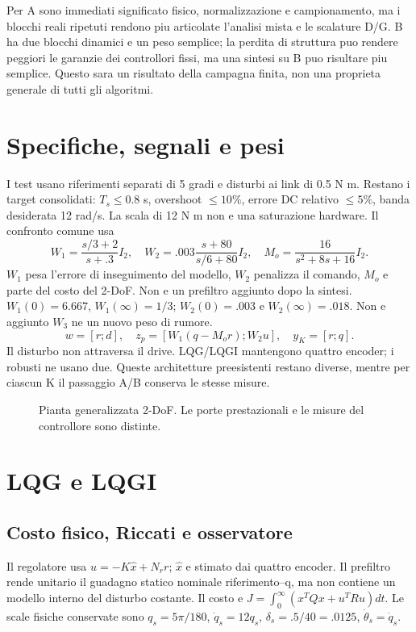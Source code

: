 \documentclass[11pt,a4paper,oneside]{report}
\newcommand{\schema}[2]{\begin{figure}[htbp]\centering\resizebox{.95\linewidth}{!}{}\caption{#2}\end{figure}}
\begin{document}
Per A sono immediati significato fisico, normalizzazione e campionamento,
ma i blocchi reali ripetuti rendono piu articolate l'analisi mista e le
scalature D/G. B ha due blocchi dinamici e un peso semplice; la perdita di
struttura puo rendere peggiori le garanzie dei controllori fissi, ma una
sintesi su B puo risultare piu semplice. Questo sara un risultato della
campagna finita, non una proprieta generale di tutti gli algoritmi.

\chapter{Specifiche, segnali e pesi}
I test usano riferimenti separati di 5 gradi e disturbi ai link di 0.5 N m.
Restano i target consolidati: $T_s\le0.8$ s, overshoot $\le10\%$,
errore DC relativo $\le5\%$, banda desiderata 12 rad/s.
La scala di 12 N m non e una saturazione hardware.
Il confronto comune usa
\[
W_1=\frac{s/3+2}{s+.3}I_2,\quad
W_2=.003\frac{s+80}{s/6+80}I_2,\quad
M_o=\frac{16}{s^2+8s+16}I_2.
\]
$W_1$ pesa l'errore di inseguimento del modello, $W_2$ penalizza il comando,
$M_o$ e parte del costo del 2-DoF. Non e un prefiltro aggiunto dopo la sintesi.
$W_1(0)=6.667$, $W_1(\infty)=1/3$; $W_2(0)=.003$ e
$W_2(\infty)=.018$. Non e aggiunto $W_3$ ne un nuovo peso di rumore.
\[
w=[r;d],\quad z_p=[W_1(q-M_or);W_2u],\quad y_K=[r;q].
\]
Il disturbo non attraversa il drive. LQG/LQGI mantengono quattro encoder;
i robusti ne usano due. Queste architetture preesistenti restano diverse,
mentre per ciascun K il passaggio A/B conserva le stesse misure.
\schema{generalizzata}{Pianta generalizzata 2-DoF. Le porte prestazionali e le misure del controllore sono distinte.}

\chapter{LQG e LQGI}
\section{Costo fisico, Riccati e osservatore}
Il regolatore usa $u=-K\hat x+N_rr$; $\hat x$ e stimato dai quattro encoder.
Il prefiltro rende unitario il guadagno statico nominale riferimento--q,
ma non contiene un modello interno del disturbo costante.
Il costo e $J=\int_0^\infty(x^TQx+u^TRu)dt$.
Le scale fisiche conservate sono $q_s=5\pi/180$, $\dot q_s=12q_s$,
$\delta_s=.5/40=.0125$, $\dot\theta_s=\dot q_s$.
\end{document}
